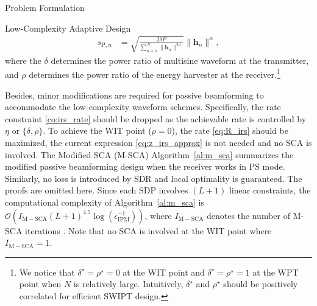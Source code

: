 \documentclass[journal]{IEEEtran}
\begin{document}
\begin{section}{Problem Formulation}
\begin{subsection}{Low-Complexity Adaptive Design}
\begin{align}
				s_{\mathrm{P}, n} &= \sqrt{\frac{2 \delta P}{\sum_{n=1}^N \lVert{\boldsymbol{h}_n \rVert^{2 \alpha}}}}\lVert{\boldsymbol{h}_n}\rVert^\alpha, \label{eq:s_p}
			\end{align}
			where the $\delta$ determines the power ratio of multisine waveform at the transmitter, and $\rho$ determines the power ratio of the energy harvester at the receiver.\footnote{We notice that $\delta^{\star}=\rho^{\star}=0$ at the WIT point and $\delta^{\star}=\rho^{\star}=1$ at the WPT point when $N$ is relatively large. Intuitively, $\delta^{\star}$ and $\rho^{\star}$ should be positively correlated for efficient SWIPT design.}

			Besides, minor modifications are required for passive beamforming to accommodate the low-complexity waveform schemes. Specifically, the rate constraint \eqref{co:irs_rate} should be dropped as the achievable rate is controlled by $\eta$ or $\{\delta,\rho\}$. To achieve the WIT point ($\rho=0$), the rate \eqref{eq:R_irs} should be maximized, the current expression \eqref{eq:z_irs_approx} is not needed and no SCA is involved. The Modified-SCA (M-SCA) Algorithm~\ref{al:m_sca} summarizes the modified passive beamforming design when the receiver works in PS mode. Similarly, no loss is introduced by SDR and local optimality is guaranteed. The proofs are omitted here. Since each SDP involves $(L+1)$ linear constraints, the computational complexity of Algorithm~\ref{al:m_sca} is $\mathcal{O}\left(I_{\mathrm{M-SCA}}(L+1)^{4.5} \log(\epsilon_{\mathrm{IPM}}^{-1})\right)$, where $I_{\mathrm{M-SCA}}$ denotes the number of M-SCA iterations \cite{Luo2010b}. Note that no SCA is involved at the WIT point where $I_{\mathrm{M-SCA}}=1$.


\end{subsection}
\end{section}
\end{document}
